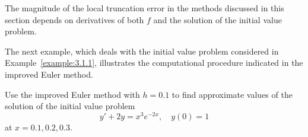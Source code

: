 The magnitude of the local truncation error in the methods discussed in this section depends on
derivatives of both $f$ and the solution of the initial value problem.

The next example, which deals with the initial value problem considered in
Example~\ref{example:3.1.1}, illustrates the computational procedure indicated in the improved Euler
method.

\begin{example}
  \label{example:3.2.1} \rm Use the improved Euler method with $h=0.1$ to find approximate values of
  the solution of the initial value problem
  \begin{equation}
    \label{eq:3.2.5}y'+2y=x^{3}e^{-2x},\quad y(0)=1
  \end{equation}
  at $x=0.1,0.2,0.3$.
\end{example}

